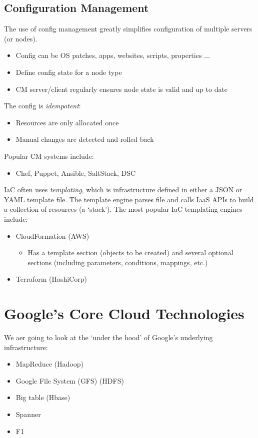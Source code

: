 \documentclass[11pt,a4paper,titlepage,dvipsnames,cmyk]{scrartcl}
\begin{document}
\subsection{Configuration Management}
The use of config management greatly simplifies configuration of multiple servers (or nodes).
\begin{itemize}
    \item Config can be OS patches, apps, websites, scripts, properties ...
    \item Define config state for a node type
    \item CM server/client regularly ensures node state is valid and up to date
\end{itemize}

The config is \textit{idempotent}:
\begin{itemize}
    \item Resources are only allocated once
    \item Manual changes are detected and rolled back
\end{itemize}

Popular CM systems include:
\begin{itemize}
    \item Chef, Puppet, Ansible, SaltStack, DSC
\end{itemize}

IaC often uses \textit{templating}, which is infrastructure defined in either a JSON or YAML template file. The template engine parses file and calls IaaS APIs to build a collection of resources (a `stack'). The most popular IaC templating engines include:
\begin{itemize}
    \item CloudFormation (AWS)
    \begin{itemize}
        \item Has a template section (objects to be created) and several optional sections (including parameters, conditions, mappings, etc.)
    \end{itemize}
    \item Terraform (HashiCorp)
\end{itemize}

\section{Google's Core Cloud Technologies}
We aer going to look at the `under the hood' of Google's underlying infrastructure:
\begin{itemize}
    \item MapReduce (Hadoop)
    \item Google File System (GFS) (HDFS)
    \item Big table (Hbase)
    \item Spanner
    \item F1
\end{itemize}
\end{document}
